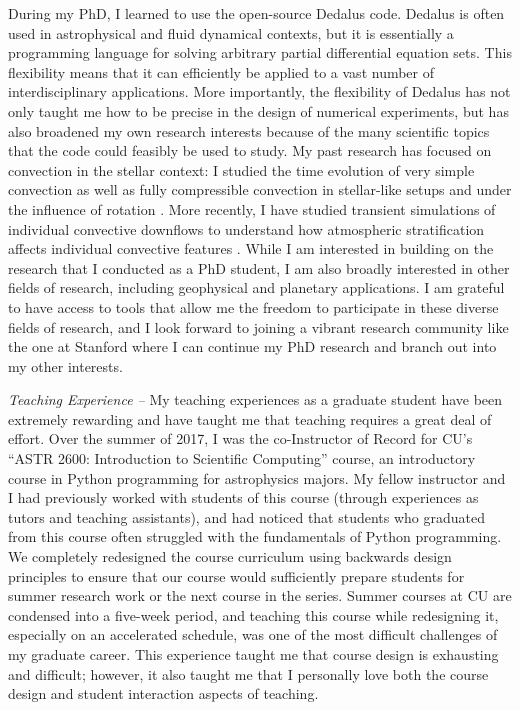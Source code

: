 \documentclass[onecolumn, 11pt, hmargin=1in, vmargin=1in]{aastex62}
\begin{document}
During my PhD, I learned to use the open-source Dedalus \citep{burns&all2019} code.
Dedalus is often used in astrophysical and fluid dynamical contexts, but it is essentially a programming language for solving arbitrary partial differential equation sets.
This flexibility means that it can efficiently be applied to a vast number of interdisciplinary applications.
More importantly, the flexibility of Dedalus has not only taught me how to be precise in the design of numerical experiments, but has also broadened my own research interests because of the many scientific topics that the code could feasibly be used to study.
My past research has focused on convection in the stellar context: I studied the time evolution of very simple convection \citep{anders&all2018} as well as fully compressible convection in stellar-like setups \citep{anders&brown2017} and under the influence of rotation \citep{anders&all2019}.
More recently, I have studied transient simulations of individual convective downflows to understand how atmospheric stratification affects individual convective features \citep{andersLB2019}.
While I am interested in building on the research that I conducted as a PhD student, I am also broadly interested in other fields of research, including geophysical and planetary applications.
I am grateful to have access to tools that allow me the freedom to participate in these diverse fields of research, and I look forward to joining a vibrant research community like the one at Stanford where I can continue my PhD research and branch out into my other interests.

\emph{Teaching Experience --}
My teaching experiences as a graduate student have been extremely rewarding and have taught me that teaching requires a great deal of effort.
Over the summer of 2017, I was the co-Instructor of Record for CU's ``ASTR 2600: Introduction to Scientific Computing'' course, an introductory course in Python programming for astrophysics majors.
My fellow instructor and I had previously worked with students of this course (through experiences as tutors and teaching assistants), and had noticed that students who graduated from this course often struggled with the fundamentals of Python programming.
We completely redesigned the course curriculum using backwards design principles to ensure that our course would sufficiently prepare students for summer research work or the next course in the series.
Summer courses at CU are condensed into a five-week period, and teaching this course while redesigning it, especially on an accelerated schedule, was one of the most difficult challenges of my graduate career.
This experience taught me that course design is exhausting and difficult; however, it also taught me that I personally love both the course design and student interaction aspects of teaching.
\end{document}
